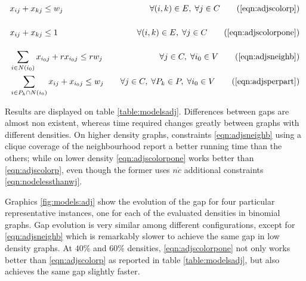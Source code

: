 \begin{align*}
&x_{ij} + x_{kj} \leq w_j \sumheight &\quad \forall (i,k) \in E, \; \forall j \in C \tag{\ref{eqn:adjscolorp}} \\
&x_{ij} + x_{kj} \leq 1 \sumheight &\quad \forall (i,k) \in E, \; \forall j \in C \tag{\ref{eqn:adjscolorpone}} \\
&\sum_{i \in N(i_0)} x_{i_0j} + r x_{i_0j} \leq r w_j &\quad \forall j \in C, \; \forall i_0 \in V \tag{\ref{eqn:adjsneighb}} \\
&\sum_{i \in P_k \cap N(i_0)} x_{ij} + x_{i_0j} \leq w_j &\quad \forall j \in C, \; \forall P_k \in P, \; \forall i_0 \in V \tag{\ref{eqn:adjsperpart}} 
\end{align*}

Results are displayed on table \ref{table:modelsadj}. Differences between gaps are almost non existent, whereas time required changes greatly between graphs with different densities. On higher density graphs, constraints \ref{eqn:adjsneighb} using a clique coverage of the neighbourhood report a better running time than the others; while on lower density \ref{eqn:adjscolorpone} works better than \ref{eqn:adjscolorp}, even though the former uses $n \dot c$ additional constraints \ref{eqn:nodelessthanwj}.

Graphics \ref{fig:models:adj} show the evolution of the gap for four particular representative instances, one for each of the evaluated densities in binomial graphs. Gap evolution is very similar among different configurations, except for \ref{eqn:adjsneighb} which is remarkably slower to achieve the same gap in low density graphs. At $40\%$ and $60\%$ densities, \ref{eqn:adjscolorpone} not only works better than \ref{eqn:adjscolorp} as reported in table \ref{table:modelsadj}, but also achieves the same gap slightly faster.

